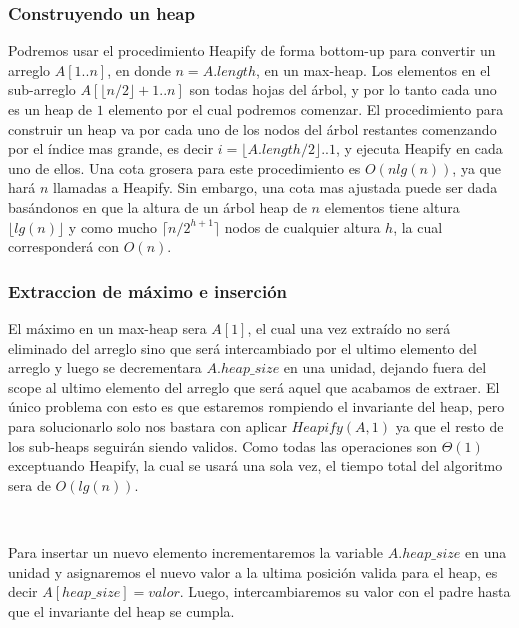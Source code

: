 \subsubsection{Construyendo un heap}

Podremos usar el procedimiento Heapify de forma bottom-up para convertir un arreglo $A[1..n]$, en donde $n=A.length$, en un max-heap. Los elementos en el sub-arreglo $A[\lfloor n/2\rfloor + 1 .. n]$ son todas hojas del \'arbol, y por lo tanto cada uno es un heap de $1$ elemento por el cual podremos comenzar. El procedimiento para construir un heap va por cada uno de los nodos del \'arbol restantes comenzando por el \'indice mas grande, es decir $i = \lfloor A.length/2 \rfloor .. 1$, y ejecuta Heapify en cada uno de ellos. Una cota grosera para este procedimiento es $O(nlg(n))$, ya que har\'a $n$ llamadas a Heapify. Sin embargo, una cota mas ajustada puede ser dada bas\'andonos en que la altura de un \'arbol heap de $n$ elementos tiene altura $\lfloor lg(n) \rfloor$ y como mucho $\lceil n/2^{h+1}\rceil$ nodos de cualquier altura $h$, la cual corresponder\'a con $O(n)$.


\subsubsection{Extraccion de m\'aximo e inserci\'on}

El m\'aximo en un max-heap sera $A[1]$, el cual una vez extra\'ido no ser\'a eliminado del arreglo sino que ser\'a intercambiado por el ultimo elemento del arreglo y luego se decrementara $A.heap\_size$ en una unidad, dejando fuera del scope al ultimo elemento del arreglo que ser\'a aquel que acabamos de extraer. El \'unico problema con esto es que estaremos rompiendo el invariante del heap, pero para solucionarlo solo nos bastara con aplicar $Heapify(A,1)$ ya que el resto de los sub-heaps seguir\'an siendo validos. Como todas las operaciones son $\Theta(1)$ exceptuando Heapify, la cual se usar\'a una sola vez, el tiempo total del algoritmo sera de $O(lg(n))$.


~

Para insertar un nuevo elemento incrementaremos la variable $A.heap\_size$ en una unidad y asignaremos el nuevo valor a la ultima posici\'on valida para el heap, es decir $A[heap\_size] = valor$. Luego, intercambiaremos su valor con el padre hasta que el invariante del heap se cumpla.

